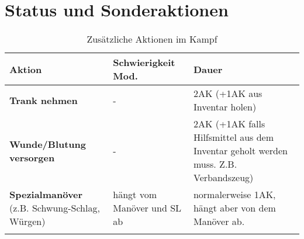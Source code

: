 \section{Status und Sonderaktionen}
\begin{longtable}{|p{4cm}|p{5cm}|p{6.5cm}|}
\hline
\textbf{Aktion} & \textbf{Schwierigkeit Mod.} & \textbf{Dauer} \\

\hline
\textbf{Trank nehmen} & - & 2AK (+1AK aus Inventar holen) \\

\hline
\textbf{Wunde/Blutung versorgen} & - & 2AK (+1AK falls Hilfsmittel aus dem Inventar geholt werden muss. Z.B. Verbandszeug) \\

\hline
\textbf{Spezialmanöver} (z.B. Schwung-Schlag, Würgen) & hängt vom Manöver und SL ab & normalerweise 1AK, hängt aber von dem Manöver ab. \\

\hline
\caption{Zusätzliche Aktionen im Kampf}
\label{tab:ZusätzlicheAktionen}
\end{longtable}

